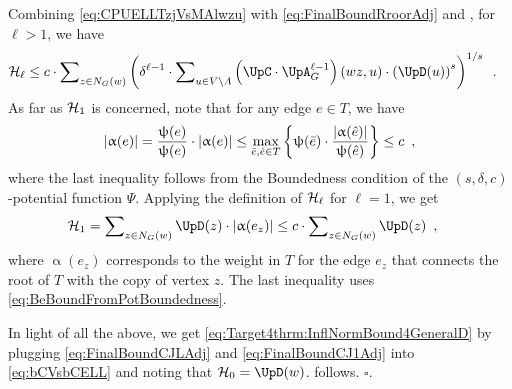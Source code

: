 \documentclass[11pt,reqno]{amsart}
\numberwithin{equation}{section}
\newcommand{\applegreen}[1]{ {\color{applegreen}#1}}
\newcommand{\blue}[1]{{\color{blue}#1}}
\newcommand{\cadmiumgreen}[1]{{\color{cadmiumgreen}#1}}
\newcommand{\darkmagenta}[1]{{\color{darkmagenta}#1}}
\newcommand{\red}[1]{{\color{red}#1}}
\newcommand{\potF}{{\Psi}}
\newcommand{\pfs}{\darkmagenta{s}}
\newcommand{\abs}[1]{\blue{|}#1\blue{|}}
\newcommand{\Adjacency}{{\UpA}}
\newcommand{\EdgeToV}{\UpC}
\renewcommand{\applegreen}[1]{#1}
\renewcommand{\blue}[1]{#1}
\renewcommand{\cadmiumgreen}[1]{#1}
\renewcommand{\darkmagenta}[1]{#1}
\renewcommand{\red}[1]{#1}
\newcommand{\ke}{\blue{e}}
\newcommand{\kell}{{\color{green(pigment)}\ell}}%
\newcommand{\ku}{\red{u}}
\newcommand{\kw}{\blue{w}}
\newcommand{\kz}{\cadmiumgreen{z}}
\renewcommand{\ke}{e}
\renewcommand{\kell}{\ell}
\renewcommand{\ku}{u}
\renewcommand{\kw}{w}
\renewcommand{\kz}{z}
\newcommand{\infweight}{\upalpha}
\begin{document}
% 
Combining \eqref{eq:CPUELLTzjVsMAlwzu} with \eqref{eq:FinalBoundRroorAdj} and , 
for $\kell>1$,  we have
\begin{align}\label{eq:FinalBoundCJLAdj}
\inflPotB_{\kell} & \leq %
c \cdot \sum\nolimits_{\kz \in N_G(\kw)} \left( \delta^{\kell-1} \cdot 
\sum\nolimits_{\ku\in V\setminus \Lambda} \left( \EdgeToV\cdot \Adjacency^{\kell-1}_G\right)(\kw\kz,\ku)
 \cdot 
\left ( \UpD(\ku)\right )^{\pfs} \right )^{1/\pfs} \enspace.
\end{align}
As far as $\mathcal{H}_1$ is concerned, note that for any edge $\ke\in T$, we have 
\begin{align} \label{eq:BeBoundFromPotBoundedness}
\abs{\infweight(\ke)}= \frac{\chiofh(\ke)}{\chiofh(\ke)} \cdot \abs{\infweight(\ke)} \leq \max_{\bar{\ke}, \hat{\ke} \in T} 
\left\{ \chiofh(\bar{\ke}) \cdot \frac{\abs{\infweight(\hat{\ke})}}{\chiofh(\hat{\ke})} \right\} \leq c \enspace,
\end{align}
where the last inequality follows from the Boundedness condition of the $(\pfs,\delta,c)$-potential function $\potF$.
%
Applying the definition of $\inflPotB_{\kell}$ for $\kell=1$, we get 
\begin{align}\label{eq:FinalBoundCJ1Adj}
\inflPotB_1
&=\sum\nolimits_{\kz \in N_G(\kw)}\UpD(\kz)\cdot \abs{\infweight(\ke_{\kz})} \leq  c \cdot \sum\nolimits_{\kz\in N_G(\kw)}\UpD(\kz)\enspace,
\end{align}
where  $\infweight(\ke_{\kz})$ corresponds to the weight in $T$ for the edge $\ke_{\kz}$ that connects the root 
of $T$ with the copy of vertex $\kz$.  The last inequality uses \eqref{eq:BeBoundFromPotBoundedness}.


In light of all the above, we get \eqref{eq:Target4thrm:InflNormBound4GeneralD} by plugging \eqref{eq:FinalBoundCJLAdj} 
and \eqref{eq:FinalBoundCJ1Adj} into  \eqref{eq:bCVsbCELL} and noting that $\inflPotB_0=\UpD(\kw)$.
%
 follows. \hfill $\square$. 
\end{document}
